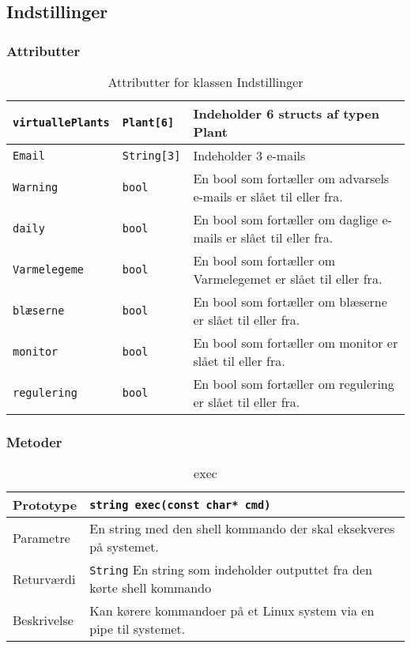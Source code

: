 \subsection{Indstillinger}

\subsubsection{Attributter}

\begin{table}[ht]
\begin{tabularx}{\textwidth}{| Z | Z | L{9 cm} |} \hline
\texttt{virtuallePlants} & \texttt{Plant[6]} & Indeholder 6 structs af typen Plant \\\hline
\texttt{Email} & \texttt{String[3]} & Indeholder 3 e-mails \\\hline
\texttt{Warning} & \texttt{bool} & En bool som fortæller om advarsels e-mails er slået til eller fra.\\\hline
\texttt{daily} & \texttt{bool} & En bool som fortæller om daglige e-mails er slået til eller fra. \\\hline
\texttt{Varmelegeme} & \texttt{bool} & En bool som fortæller om Varmelegemet er slået til eller fra.\\\hline
\texttt{blæserne} & \texttt{bool} & En bool som fortæller om blæserne er slået til eller fra. \\\hline
\texttt{monitor} & \texttt{bool} & En bool som fortæller om monitor er slået til eller fra. \\\hline
\texttt{regulering} & \texttt{bool} & En bool som fortæller om regulering er slået til eller fra. \\\hline
\end{tabularx}
\caption{Attributter for klassen Indstillinger}
\label{table:Indstillinger_attributter}
\end{table}

\subsubsection{Metoder}

\begin{table}[ht]
\begin{tabularx}{\textwidth}{| L{2.5 cm} | Z |} \hline
Prototype & \texttt{string exec(const char* cmd)} \\\hline
Parametre & En string med den shell kommando der skal eksekveres på systemet. \\\hline
Returværdi & \texttt{String} \newline
En string som indeholder outputtet fra den kørte shell kommando \\\hline
Beskrivelse & Kan kørere kommandoer på et Linux system via en pipe til systemet. \\\hline
\end{tabularx}
\caption{exec}
\label{table:Indstillinger_exec}
\end{table}


